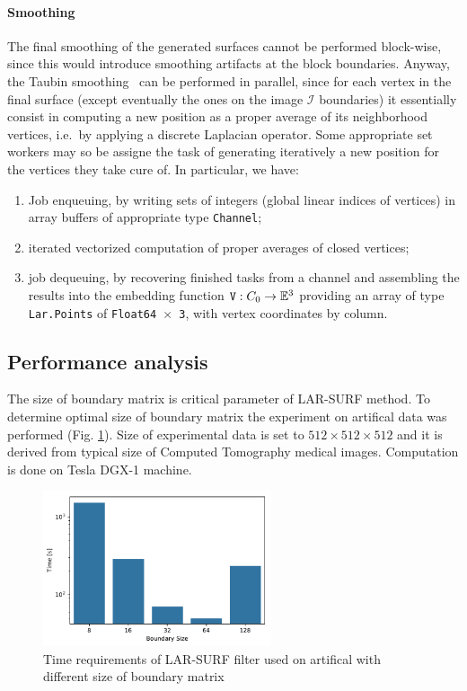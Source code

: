 \paragraph{Smoothing} 
The final smoothing of the generated surfaces cannot be performed block-wise, since this would introduce smoothing artifacts at the block boundaries. Anyway, the Taubin smoothing~\cite{} can be performed in parallel, since for each vertex in the final surface (except eventually the ones on the image $\mathcal{I}$ boundaries) it essentially consist in computing a new position as a proper average of its neighborhood vertices, i.e.~by applying a discrete Laplacian operator.  Some appropriate set workers may so be assigne the task of generating iteratively a new position for the vertices they take cure of. In particular, we have:
\begin{enumerate}

\item Job enqueuing, by writing sets of integers (global linear indices of vertices) in array buffers of appropriate type \texttt{Channel};

\item iterated vectorized computation of proper averages of closed vertices;

\item job dequeuing, by recovering finished tasks from a channel and assembling the results into the embedding function $\mathtt{V}: C_0 \to \mathbb{E}^3$ providing an array of type \texttt{Lar.Points} of \texttt{Float64 $\times$ 3}, with vertex coordinates by column.
\end{enumerate}



\subsection{Performance analysis}\label{sec:analysis}

The size of boundary matrix is critical parameter of LAR-SURF method. To determine optimal size of boundary matrix the experiment on artifical data was performed (Fig.  \ref{fig:bm_size_tesla}). Size of experimental data is set to $512\times512\times512$ and it is derived from typical size of Computed Tomography medical images. Computation is done on Tesla DGX-1 machine.

\begin{figure}
\centering
\includegraphics[width=0.6\textwidth]{figs/bm_size_tesla.pdf} 
\caption{Time requirements of LAR-SURF filter used on artifical with different size of boundary matrix}
\label{fig:bm_size_tesla}
\end{figure}




